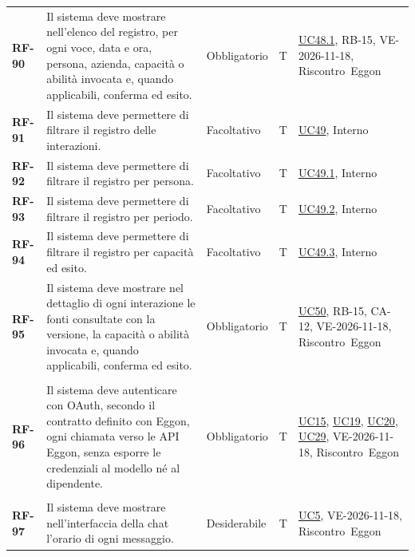 \documentclass[documento]{gpt}
\begin{document}
{\begin{longtable}{@{}>{\raggedright\arraybackslash}p{1.35cm}>{\raggedright\arraybackslash}p{7.3cm}>{\raggedright\arraybackslash}p{1.9cm}>{\centering\arraybackslash}p{0.75cm}>{\raggedright\arraybackslash}p{3.1cm}@{}}
\leavevmode\hypertarget{req:RF-90}{\textbf{RF-90}} & Il sistema deve mostrare nell’elenco del registro, per ogni voce, data e ora, persona, azienda, capacità o abilità invocata e, quando applicabili, conferma ed esito. & Obbligatorio & T & \hyperref[uc:tr_voce]{UC48.1}, \mbox{RB-15}, \mbox{VE-2026-11-18}, \mbox{Riscontro Eggon} \\
\leavevmode\hypertarget{req:RF-91}{\textbf{RF-91}} & Il sistema deve permettere di filtrare il registro delle interazioni. & Facoltativo & T & \hyperref[uc:tr_filtro]{UC49}, \mbox{Interno} \\
\leavevmode\hypertarget{req:RF-92}{\textbf{RF-92}} & Il sistema deve permettere di filtrare il registro per persona. & Facoltativo & T & \hyperref[uc:tr_f_persona]{UC49.1}, \mbox{Interno} \\
\leavevmode\hypertarget{req:RF-93}{\textbf{RF-93}} & Il sistema deve permettere di filtrare il registro per periodo. & Facoltativo & T & \hyperref[uc:tr_f_periodo]{UC49.2}, \mbox{Interno} \\
\leavevmode\hypertarget{req:RF-94}{\textbf{RF-94}} & Il sistema deve permettere di filtrare il registro per capacità ed esito. & Facoltativo & T & \hyperref[uc:tr_f_capacita]{UC49.3}, \mbox{Interno} \\
\leavevmode\hypertarget{req:RF-95}{\textbf{RF-95}} & Il sistema deve mostrare nel dettaglio di ogni interazione le fonti consultate con la versione, la capacità o abilità invocata e, quando applicabili, conferma ed esito. & Obbligatorio & T & \hyperref[uc:tr_dettaglio]{UC50}, \mbox{RB-15}, \mbox{CA-12}, \mbox{VE-2026-11-18}, \mbox{Riscontro Eggon} \\
\addlinespace[3pt]\multicolumn{5}{@{}l}{\textbf{\sffamily Accesso e profilo}} \\ \addlinespace[2pt]
\leavevmode\hypertarget{req:RF-96}{\textbf{RF-96}} & Il sistema deve autenticare con OAuth, secondo il contratto definito con Eggon, ogni chiamata verso le API Eggon, senza esporre le credenziali al modello né al dipendente. & Obbligatorio & T & \hyperref[uc:dati]{UC15}, \hyperref[uc:stato_rich]{UC19}, \hyperref[uc:registra]{UC20}, \hyperref[uc:annulla_inv]{UC29}, \mbox{VE-2026-11-18}, \mbox{Riscontro Eggon} \\
\addlinespace[3pt]\multicolumn{5}{@{}l}{\textbf{\sffamily Conversazione}} \\ \addlinespace[2pt]
\leavevmode\hypertarget{req:RF-97}{\textbf{RF-97}} & Il sistema deve mostrare nell’interfaccia della chat l’orario di ogni messaggio. & Desiderabile & T & \hyperref[uc:vis_conv]{UC5}, \mbox{VE-2026-11-18}, \mbox{Riscontro Eggon} \\

\end{longtable}}
\end{document}
